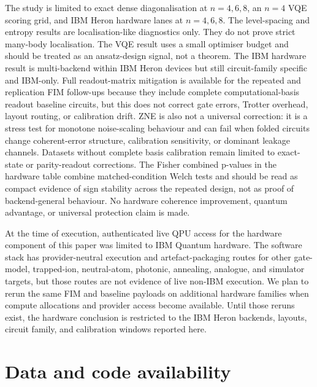 \documentclass[preprint,aps,physrev,superscriptaddress,floatfix,longbibliography]{revtex4-2}
\begin{document}
The study is limited to exact dense diagonalisation at $n=4,6,8$, an
$n=4$ VQE scoring grid, and IBM Heron hardware lanes at $n=4,6,8$. The
level-spacing and entropy results are
localisation-like diagnostics only. They do not prove strict many-body
localisation. The VQE result uses a small optimiser budget and should be treated
as an ansatz-design signal, not a theorem. The IBM hardware result is
multi-backend within IBM Heron devices but still circuit-family specific and
IBM-only. Full readout-matrix mitigation is available for the repeated and
replication FIM follow-ups because they include complete computational-basis
readout baseline
circuits, but this does not correct gate errors, Trotter overhead, layout
routing, or calibration drift. ZNE is also not a universal correction:
it is a stress test for monotone noise-scaling behaviour and can fail when
folded circuits change coherent-error structure, calibration sensitivity, or
dominant leakage channels. Datasets without complete basis calibration remain
limited to exact-state or parity-readout corrections. The Fisher combined
p-values in the hardware table combine matched-condition Welch tests and
should be read as compact evidence of sign stability across the repeated
design, not as proof of backend-general behaviour. No hardware coherence
improvement, quantum advantage, or universal protection claim is made.

At the time of execution, authenticated live QPU access for the hardware
component of this paper was limited to IBM Quantum hardware. The software stack
has provider-neutral execution and artefact-packaging routes for other
gate-model, trapped-ion, neutral-atom, photonic, annealing, analogue, and
simulator targets, but those routes are not evidence of live non-IBM execution.
We plan to rerun the same FIM and baseline payloads on additional hardware
families when compute allocations and provider access become available. Until
those reruns exist, the hardware conclusion is restricted to the IBM Heron
backends, layouts, circuit family, and calibration windows reported here.

\section{Data and code availability}
\end{document}
